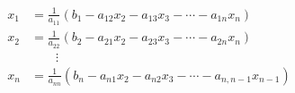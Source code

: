 \documentclass[A4,11pt]{article}
\begin{document}
\thispagestyle{empty}
\begin{align*}
x_1 &= \frac{1}{a_{11}}(b_1 - a_{12}x_2 - a_{13}x_3 - \cdots - a_{1n}x_n)\\
x_2 &= \frac{1}{a_{22}}(b_2 - a_{21}x_2 - a_{23}x_3 - \cdots - a_{2n}x_n)\\
    & \qquad \vdots \\
x_n &= \frac{1}{a_{nn}}(b_n - a_{n1}x_2 - a_{n2}x_3 - \cdots - a_{n,n-1}x_{n-1})
\end{align*}
\end{document}
